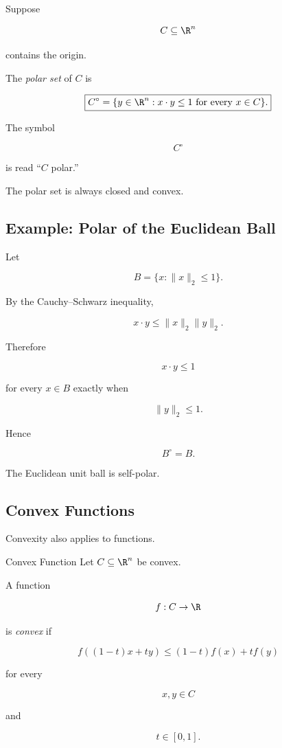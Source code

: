 Suppose

\[
C\subseteq\R^n
\]

contains the origin.

The \emph{polar set} of \(C\) is

\[
\boxed{
C^\circ
=
\{
y\in\R^n:
x\cdot y\leq1
\text{ for every }x\in C
\}.
}
\]

The symbol

\[
C^\circ
\]

is read ``\(C\) polar.''

The polar set is always closed and convex.

\subsection{Example: Polar of the Euclidean Ball}
\label{subsec:polar-euclidean-ball}

Let

\[
B=
\{x:\|x\|_2\leq1\}.
\]

By the Cauchy--Schwarz inequality,

\[
x\cdot y
\leq
\|x\|_2\|y\|_2.
\]

Therefore

\[
x\cdot y\leq1
\]

for every \(x\in B\) exactly when

\[
\|y\|_2\leq1.
\]

Hence

\[
\boxed{
B^\circ=B.
}
\]

The Euclidean unit ball is self-polar.

\subsection{Convex Functions}
\label{subsec:convex-functions-geometry}

Convexity also applies to functions.

\begin{definitionbox}{Convex Function}
Let \(C\subseteq\R^n\) be convex.

A function

\[
f:C\to\R
\]

is \emph{convex} if

\[
\boxed{
f((1-t)x+ty)
\leq
(1-t)f(x)+tf(y)
}
\]

for every

\[
x,y\in C
\]

and

\[
t\in[0,1].
\]
\end{definitionbox}

